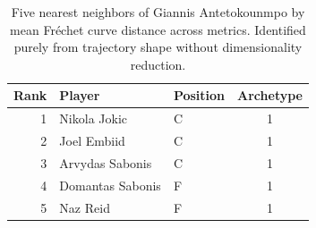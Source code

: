 \begin{table}[htbp]
  \centering\small
  \begin{tabular}{rllc}
    \toprule
    Rank & Player & Position & Archetype \\
    \midrule
    1 & Nikola Jokic & C & 1 \\
    2 & Joel Embiid & C & 1 \\
    3 & Arvydas Sabonis & C & 1 \\
    4 & Domantas Sabonis & F & 1 \\
    5 & Naz Reid & F & 1 \\
    \bottomrule
  \end{tabular}
  \caption{Five nearest neighbors of Giannis Antetokounmpo by mean Fr\'{e}chet curve distance across metrics. Identified purely from trajectory shape without dimensionality reduction.}
  \label{tab:Giannis_Antetokounmpo_frechet_curve_neighbors}
\end{table}

